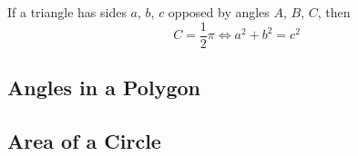 \documentclass[fleqn,a4paper,11pt]{article}
\begin{document}

    If a triangle has sides \(a\), \(b\), \(c\) opposed by angles \(A\), \(B\),
    \(C\), then
    \begin{equation}
    C = \frac 12 \pi \iff a^2 + b^2 = c^2
    \end{equation}

    \subsection{Angles in a Polygon} \label{sec_geom_polygon_angles}

    \subsection{Area of a Circle}

\end{document}
